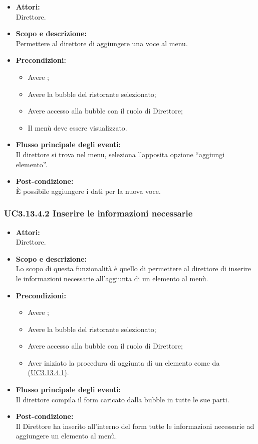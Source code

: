 \begin{itemize}
	\item \textbf{Attori:}
	\\Direttore.
	\item \textbf{Scopo e descrizione:} 
	\\Permettere al direttore di aggiungere una voce al menu.
	\item \textbf{Precondizioni:}
	\begin{itemize}
		\item Avere ;
		\item Avere la bubble del ristorante selezionato;
		\item Avere accesso alla bubble con il ruolo di Direttore;
		\item Il menù deve essere visualizzato.
	\end{itemize}
	\item \textbf{Flusso principale degli eventi:}
	\\Il direttore si trova nel menu, seleziona l’apposita opzione “aggiungi elemento”.
	\item \textbf{Post-condizione:}
	\\È possibile aggiungere i dati per la nuova voce.
\end{itemize}

\subsubsection{UC3.13.4.2 Inserire le informazioni necessarie} \label{UC3.13.4.2}

\begin{itemize}
	\item \textbf{Attori:}
	\\Direttore.
	\item \textbf{Scopo e descrizione:} 
	\\Lo scopo di questa funzionalità è quello di permettere al direttore di inserire le informazioni necessarie all’aggiunta di un elemento al menù.
	\item \textbf{Precondizioni:}
	\begin{itemize}
		\item Avere ;
		\item Avere la bubble del ristorante selezionato;
		\item Avere accesso alla bubble con il ruolo di Direttore;
		\item Aver iniziato la procedura di aggiunta di un elemento come da \hyperref[UC3.13.4.1]{(UC3.13.4.1)}.
	\end{itemize}
	\item \textbf{Flusso principale degli eventi:}
	\\Il direttore compila il form caricato dalla bubble in tutte le sue parti.
	\item \textbf{Post-condizione:}
	\\Il Direttore ha inserito all’interno del form tutte le informazioni necessarie ad aggiungere un elemento al menù.
\end{itemize}

